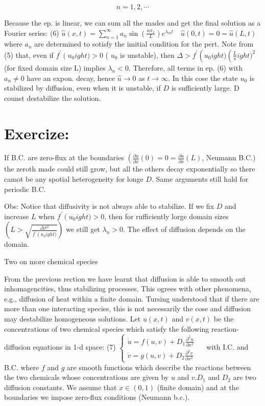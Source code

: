 $$ 
n=1,2, \cdots
$$

Because the ep. is linear, we can sum all the mades and get the final solution as a Fourier series:
(6) $\hat{u}(x, t)=\sum_{n=1}^{\infty} a_{n} \sin \left(\frac{n \pi_{x}}{L}\right) e^{\lambda_{m} t} \quad \hat{u}(0, t)=0=\hat{u}(L, t)$
where $a_{n}$ are determined to sotisfy the imitial condition for the pert. Note from (5) that, even if $f^{\prime}
\left(u_{0}
ight)>0$ ( $u_{0}$ is unstable), then $\Delta>f^{\prime}
\left(u_{0}
ight)\left(\frac{L}{\pi}
ight)^{2}$ (for fixed domain size L) implies $\lambda_{n}<0$. Therefore, all terms in ep. (6) with $a_{n} \neq 0$ have an expon. decay, hence $\hat{u} \rightarrow 0$ as $t \rightarrow \infty$.
In this cose the state $u_{0}$ is stabilized by diffusion, even when it is unstable, if $D$ is sufficiently large. D counst destabilize the solution.

\section*{Exercize:}
If B.C. are zero-flux at the boundaries $\left(\frac{\partial u}{\partial x}(0)=0=\frac{\partial u}{\partial x}(L)\right.$, Neumann B.C.) the zeroth made could still grow, but all the others decay exponentially so there camot be any spotial heterogeneity for longe $D$. Same arguments still hald for periodic B.C.

Obs: Notice that diffusivity is not always able to stabilize.
If we fix $D$ and increase $L$ when $f^{\prime}
\left(u_{0}
ight)>0$, then for rufficiently lorge domain sizes $\left(L>\sqrt{\frac{\Delta \pi^{2}}{f^{\prime}
\left(n_{0}
ight)}}
\right)$ we still get $\lambda_{n}>0$. The effect of diffusion depends on the domain.

Two on more chemical species

From the previous rection we have learnt that diffusion is able to smooth out inhomagencities, thus stabilizing processes. This ogrees with other phenomena, e.g., diffusion of heat within a finite domain.
Tursing understood that if there are more than one interacting species, this is not necessarily the cose and diffusion may destabilize homogeneous solutions.
Let $u(x, t)$ and $v(x, t)$ be the concentrations of two chemical species which satisfy the following reaction-diffusion equations in 1-d space:
(7) $\left\{
\begin{array}{l}\dot{u}=f(u, v)+D_{1} \frac{\partial^{2} u}{\partial x^{2}} \\ 
\dot{v}=g(u, v)+D_{2} \frac{\partial^{2} v}{\partial x^{2}}\end{array}\right. \quad$ with I.C. and B.C.
where $f$ and $g$ are smooth functions which describe the reactions between the two chemicals whose concentrations are given by $u$ and $v . D_{1}$ and $D_{2}$ are two diffusion constants. We assume that $x \in(0,1)$ (finite domain) and at the boundaries we impose zero-flux conditions (Neumann b.c.).

